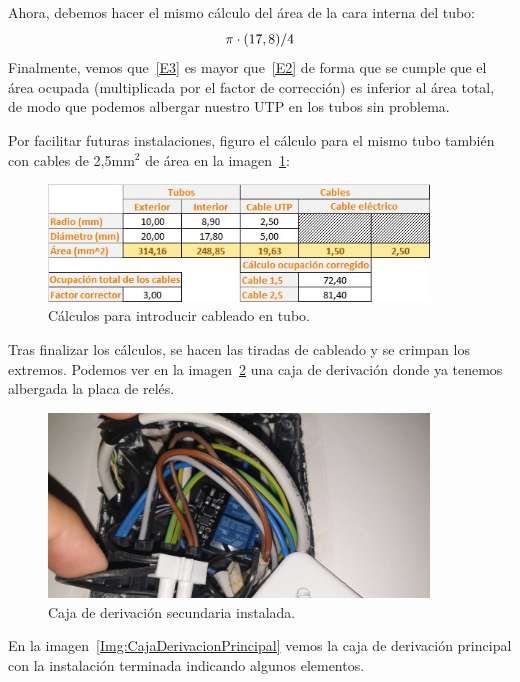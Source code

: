 Ahora, debemos hacer el mismo cálculo del área de la cara interna del tubo:
\begin{equation}
\centering
\pi \cdot (17,8)/4
\end{equation}\label{E3}
Finalmente, vemos que~\ref{E3} es mayor que~\ref{E2} de forma que se cumple que el área ocupada (multiplicada por el factor de corrección) es inferior al área total, de modo que podemos albergar nuestro UTP en los tubos sin problema.

Por facilitar futuras instalaciones, figuro el cálculo para el mismo tubo también con cables de 2,5mm$^{2}$ de área en la imagen~\ref{Img:Calculo}:

\begin{figure}[h]
    \centering
    \includegraphics[width=0.9\textwidth]{img/Diagramas/calculo cables.jpeg}
    \caption{Cálculos para introducir cableado en tubo.} \label{Img:Calculo}
\end{figure}

Tras finalizar los cálculos, se hacen las tiradas de cableado y se crimpan los extremos. Podemos ver en la imagen~\ref{Img:CajaDerivacion} una caja de derivación donde ya tenemos albergada la placa de relés.

\begin{figure}[h]
    \centering
    \includegraphics[width=0.9\textwidth]{img/fotos/caja-persiana.jpeg}
    \caption{Caja de derivación secundaria instalada.} \label{Img:CajaDerivacion}
\end{figure}

En la imagen~\ref{Img:CajaDerivacionPrincipal} vemos la caja de derivación principal con la instalación terminada indicando algunos elementos.

